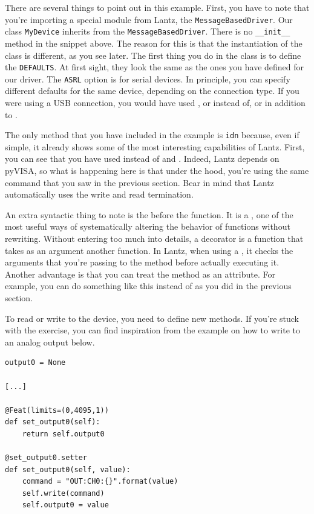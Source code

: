 There are several things to point out in this example. First, you have to note that you're importing a special module from Lantz, the \texttt{MessageBasedDriver}. Our class \texttt{MyDevice} inherits from the \texttt{MessageBasedDriver}. There is no \texttt{__init__} method in the snippet above. The reason for this is that the instantiation of the class is different, as you see later. The first thing you do in the class is to define the \texttt{DEFAULTS}. At first sight, they look the same as the ones you have defined for our driver. The \texttt{ASRL} option is for serial devices. In principle, you can specify different defaults for the same device, depending on the connection type. If you were using a {USB} connection, you would have used , or  instead of, or in addition to .

The only method that you have included in the example is \texttt{idn} because, even if simple, it already shows some of the most interesting capabilities of Lantz. First, you can see that you have used  instead of  and . Indeed, Lantz depends on pyVISA, so what is happening here is that under the hood, you're using the same command that you saw in the previous section. Bear in mind that Lantz automatically uses the write and read termination.

An extra syntactic thing to note is the  before the function. It is a , one of the most useful ways of systematically altering the behavior of functions without rewriting. Without entering too much into details, a decorator is a function that takes as an argument another function. In Lantz, when using a , it checks the arguments that you're passing to the method before actually executing it. Another advantage is that you can treat the method as an attribute. For example, you can do something like this  instead of  as you did in the previous section.


To read or write to the device, you need to define new methods. If you're stuck with the exercise, you can find inspiration from the example on how to write to an analog output below.

\begin{verbatim}
output0 = None

[...]

@Feat(limits=(0,4095,1))
def set_output0(self):
    return self.output0

@set_output0.setter
def set_output0(self, value):
    command = "OUT:CH0:{}".format(value)
    self.write(command)
    self.output0 = value
\end{verbatim}

